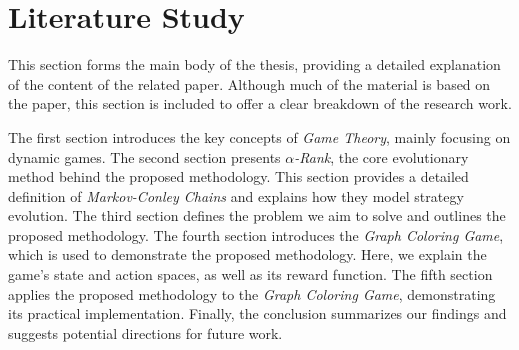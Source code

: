 \section{Literature Study}

    This section forms the main body of the thesis, providing a detailed explanation of the content of the related paper. Although much of the material is based on the paper, this section is included to offer a clear breakdown of the research work.\tinydouble

    \noindent
    The first section introduces the key concepts of \emph{Game Theory}, mainly focusing on dynamic games. The second section presents \emph{$\alpha$-Rank}, the core evolutionary method behind the proposed methodology. This section provides a detailed definition of \emph{Markov-Conley Chains} and explains how they model strategy evolution. The third section defines the problem we aim to solve and outlines the proposed methodology. The fourth section introduces the \emph{Graph Coloring Game}, which is used to demonstrate the proposed methodology. Here, we explain the game's state and action spaces, as well as its reward function. The fifth section applies the proposed methodology to the \emph{Graph Coloring Game}, demonstrating its practical implementation. Finally, the conclusion summarizes our findings and suggests potential directions for future work.

\newpage


\newpage


\newpage


\newpage


\newpage


\newpage


\newpage